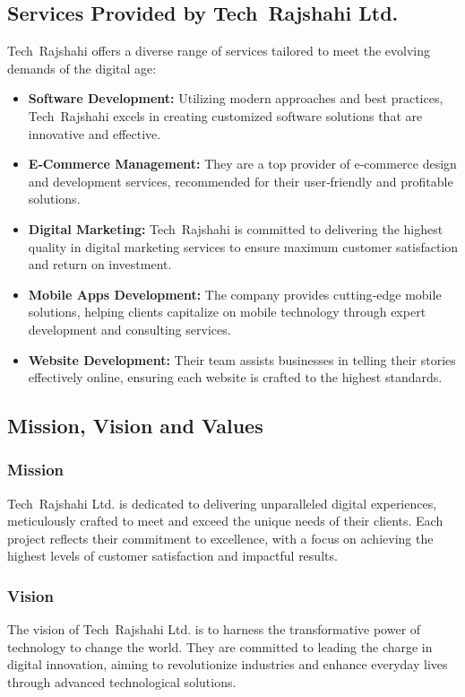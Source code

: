 \documentclass[12pt,a4paper]{article}
\begin{document}
\subsection{Services Provided by Tech Rajshahi Ltd.}
Tech Rajshahi offers a diverse range of services tailored to meet the evolving demands of the digital age:
\begin{itemize}
    \item \textbf{Software Development:} Utilizing modern approaches and best practices, Tech Rajshahi excels in creating customized software solutions that are innovative and effective.
    \item \textbf{E‑Commerce Management:} They are a top provider of e‑commerce design and development services, recommended for their user‑friendly and profitable solutions.
    \item \textbf{Digital Marketing:} Tech Rajshahi is committed to delivering the highest quality in digital marketing services to ensure maximum customer satisfaction and return on investment.
    \item \textbf{Mobile Apps Development:} The company provides cutting‑edge mobile solutions, helping clients capitalize on mobile technology through expert development and consulting services.
    \item \textbf{Website Development:} Their team assists businesses in telling their stories effectively online, ensuring each website is crafted to the highest standards.
\end{itemize}

\newpage
\subsection{Mission, Vision and Values}
\subsubsection{Mission}
Tech Rajshahi Ltd. is dedicated to delivering unparalleled digital experiences, meticulously crafted to meet and exceed the unique needs of their clients. Each project reflects their commitment to excellence, with a focus on achieving the highest levels of customer satisfaction and impactful results.

\subsubsection{Vision}
The vision of Tech Rajshahi Ltd. is to harness the transformative power of technology to change the world. They are committed to leading the charge in digital innovation, aiming to revolutionize industries and enhance everyday lives through advanced technological solutions.
\end{document}
